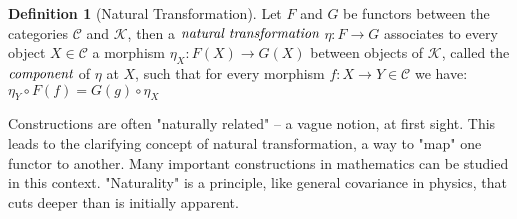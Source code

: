 \documentclass[10pt, oneside, reqno]{amsart}
\theoremstyle{plain}%
\theoremstyle{definition}
\newtheorem{defn}[thm]{Definition}
\theoremstyle{remark}
\begin{document}
\begin{defn}[Natural Transformation]
	Let $F$ and $G$ be functors between the categories $\mathcal{C}$ and $\mathcal{K}$, then a $\emph{natural transformation}$ $\eta : F \to G$
	associates to every object $X \in \mathcal{C}$ a morphism $\eta_{X} : F(X) \to G(X)$ between objects of $\mathcal{K}$, called the $\emph{component}$
	of $\eta$ at $X$, such that for every morphism $f : X \to Y \in \mathcal{C}$ we have:
	\\
	$\eta_{Y} \circ F(f) = G(g) \circ \eta_{X}$
\end{defn}
Constructions are often "naturally related" – a vague notion, at first sight.
This leads to the clarifying concept of natural transformation, a way to "map" one functor to another.
Many important constructions in mathematics can be studied in this context.
"Naturality" is a principle, like general covariance in physics, that cuts deeper than is initially apparent.
\end{document}
